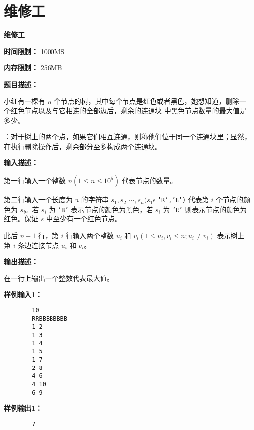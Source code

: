 \documentclass[a4paper]{ctexart}
\begin{document}
\newpage
	
\section{维修工}
	
\begin{center}
	\Large \textbf{维修工}
\end{center}
	
\noindent\textbf{时间限制：} 1000MS
	
\noindent\textbf{内存限制：} 256MB
	
\vspace{10pt}
	
\noindent\textbf{题目描述：}
	
小红有一棵有 $n$ 个节点的树，其中每个节点是红色或者黑色，她想知道，删除一个红色节点以及与它相连的全部边后，剩余的连通块 \dag 中黑色节点数量的最大值是多少。
	
	\dag：对于树上的两个点，如果它们相互连通，则称他们位于同一个连通块里；显然，在执行删除操作后，剩余部分至多构成两个连通块。
	
	\noindent\textbf{输入描述：}
	
	第一行输入一个整数 $n (1 \leq n \leq 10^5)$ 代表节点的数量。
	
	第二行输入一个长度为 $n$ 的字符串 $s_1,s_2,\cdots,s_n (s_1 \epsilon$ \texttt{{'R','B'})} 代表第 $i$ 个节点的颜色为 $s_i$。若 $s_i$ 为 \texttt{'B'} 表示节点的颜色为黑色，若 $s_i$ 为 \texttt{'R'} 则表示节点的颜色为红色。保证 $s$ 中至少有一个红色节点。
	
	此后 $n-1$ 行，第 $i$ 行输入两个整数 $u_i$ 和 $v_i(1 \leq u_i, v_i \leq n; u_i \neq v_i)$ 表示树上第 $i$ 条边连接节点 $u_i$ 和 $v_i$。
	
	\noindent\textbf{输出描述：} 
	
	在一行上输出一个整数代表最大值。
	
	\noindent\textbf{样例输入1：}
	
	\lstset{numbers=none}
	\begin{lstlisting}
		10
		RRBBBBBBBB
		1 2
		1 3
		1 4
		1 5
		1 7 
		2 8
		4 6
		4 10
		6 9
	\end{lstlisting}
	\lstset{numbers=left}
	
	\noindent\textbf{样例输出1：}
	\lstset{numbers=none}
	\begin{lstlisting}
		7
	\end{lstlisting}
	\lstset{numbers=left}
	
	
	\vspace{10pt}
	
\end{document}
